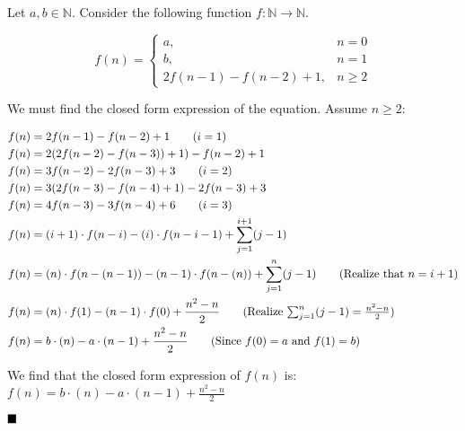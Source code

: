 \documentclass[20pt]{article}
\begin{document}
\begin{text}
    Let $a, b \in \mathbb{N}$. Consider the following function $f: \mathbb{N} \to \mathbb{N}$.
\end{text}

\begin{equation}
    f(n) = 
    \begin{cases}
      a, & n = 0\nonumber\\
      b, & n = 1\nonumber\\
      2f(n-1) - f(n-2) + 1, & n \geq 2 \nonumber
    \end{cases}
\end{equation}

\noindent
\begin{text}
    We must find the closed form expression of the equation. Assume $n \geq 2$:
\end{text}

\begin{align}
    f(n) &= 2f(n-1) - f(n-2) + 1 \tag{$i = 1$}\nonumber\\
    f(n) &= 2(2f(n-2) - f(n-3)) + 1) - f(n-2) + 1\nonumber\\
    f(n) &= 3f(n-2) - 2f(n-3) + 3 \tag{$i = 2$}\nonumber\\
    f(n) &= 3(2f(n-3) - f(n-4) + 1) - 2f(n-3) + 3\nonumber\\
    f(n) &= 4f(n-3) - 3f(n-4) + 6 \tag{$i = 3$}\nonumber\\
    f(n) &= (i+1) \cdot f(n - i) - (i) \cdot f(n - i - 1) + \sum_{j=1}^{i+1}(j - 1)\nonumber\\
    f(n) &= (n) \cdot f(n - (n - 1)) - (n - 1) \cdot f(n - (n)) + \sum_{j=1}^{n}(j-1)\tag{Realize that $n = i + 1$}\nonumber\\
    f(n) &= (n) \cdot f(1) - (n - 1) \cdot f(0) + \frac{n^2-n}{2} \tag{Realize $\sum_{j=1}^{n}(j - 1) = \frac{n^2-n}{2}$}\nonumber\\
    f(n) &= b \cdot (n) - a \cdot (n - 1) + \frac{n^2-n}{2}\tag{Since $f(0) = a$ and $f(1) = b$}\nonumber
\end{align}

\noindent
\begin{text}
    We find that the closed form expression of $f(n)$ is: $f(n) = b \cdot (n) - a \cdot (n - 1) + \frac{n^2-n}{2}$\\
\end{text}

$\hfill \blacksquare$


\newpage
\end{document}
